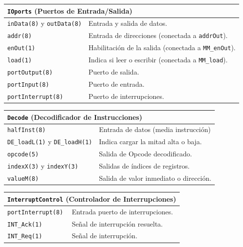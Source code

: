 \documentclass[a4paper,11pt]{article}
\begin{document}
\begin{center}
\begin{tabular}{p{6.4cm}|p{8.2cm}}
\multicolumn{2}{l}{ \texttt{IOports} (Puertos de Entrada/Salida) }\\
\hline                                      
\texttt{inData(8)} y \texttt{outData(8)}    & Entrada y salida de datos.\\
\texttt{addr(8)}                            & Entrada de direcciones (conectada a \texttt{addrOut}).\\
\texttt{enOut(1)}                           & Habilitación de la salida (conectada a \texttt{MM\_enOut}).\\
\texttt{load(1)}                            & Indica si leer o escribir (conectada a \texttt{MM\_load}).\\
\texttt{portOutput(8)}                      & Puerto de salida.\\
\texttt{portInput(8)}                       & Puerto de entrada.\\
\texttt{portInterrupt(8)}                   & Puerto de interrupciones.\\
\end{tabular}
\end{center}

\begin{center}
\begin{tabular}{p{6.4cm}|p{8.2cm}}
\multicolumn{2}{l}{ \texttt{Decode} (Decodificador de Instrucciones) }\\ %
\hline
\texttt{halfInst(8)}                          & Entrada de datos (media instrucción)\\
\texttt{DE\_loadL(1)} y \texttt{DE\_loadH(1)} & Indica cargar la mitad alta o baja.\\
\texttt{opcode(5)}                            & Salida de Opcode decodificado.\\
\texttt{indexX(3)} y \texttt{indexY(3)}       & Salidas de índices de registros.\\
\texttt{valueM(8)}                            & Salida de valor inmediato o dirección.\\
\end{tabular}
\end{center}

\begin{center}
\begin{tabular}{p{6.4cm}|p{8.2cm}}
\multicolumn{2}{l}{ \texttt{InterruptControl} (Controlador de Interrupciones) }\\
\hline
\texttt{portInterrupt(8)}                   & Entrada puerto de interrupciones.\\
\texttt{INT\_Ack(1)}                        & Señal de interrupción resuelta.\\
\texttt{INT\_Req(1)}                        & Señal de interrupción.\\
\end{tabular}
\end{center}
\end{document}
